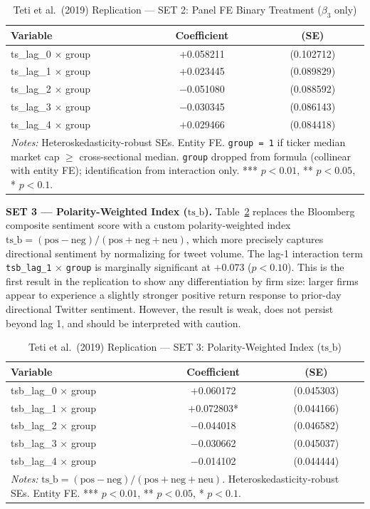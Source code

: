 \documentclass[12pt]{article}
\begin{document}
\begin{table}[htbp]
\centering
\caption{Teti et al.\ (2019) Replication --- SET 2: Panel FE Binary Treatment ($\beta_3$ only)}
\label{tab:teti_set2}
\begin{tabular}{lcc}
\hline\hline
Variable & Coefficient & (SE) \\
\hline
ts\_lag\_0 $\times$ group & $+$0.058211 & (0.102712) \\
ts\_lag\_1 $\times$ group & $+$0.023445 & (0.089829) \\
ts\_lag\_2 $\times$ group & $-$0.051080 & (0.088592) \\
ts\_lag\_3 $\times$ group & $-$0.030345 & (0.086143) \\
ts\_lag\_4 $\times$ group & $+$0.029466 & (0.084418) \\
\hline\hline
\multicolumn{3}{p{0.9\linewidth}}{\footnotesize \textit{Notes:} Heteroskedasticity-robust SEs. Entity FE. \texttt{group = 1} if ticker median market cap $\geq$ cross-sectional median. \texttt{group} dropped from formula (collinear with entity FE); identification from interaction only. *** $p<0.01$, ** $p<0.05$, * $p<0.1$.}
\end{tabular}
\end{table}

\textbf{SET 3 --- Polarity-Weighted Index ($\text{ts\_b}$).} Table~\ref{tab:teti_set3} replaces the Bloomberg composite sentiment score with a custom polarity-weighted index $\text{ts\_b} = (\text{pos} - \text{neg}) / (\text{pos} + \text{neg} + \text{neu})$, which more precisely captures directional sentiment by normalizing for tweet volume. The lag-1 interaction term \texttt{tsb\_lag\_1} $\times$ \texttt{group} is marginally significant at $+$0.073 ($p < 0.10$). This is the first result in the replication to show any differentiation by firm size: larger firms appear to experience a slightly stronger positive return response to prior-day directional Twitter sentiment. However, the result is weak, does not persist beyond lag 1, and should be interpreted with caution.

\begin{table}[htbp]
\centering
\caption{Teti et al.\ (2019) Replication --- SET 3: Polarity-Weighted Index ($\text{ts\_b}$)}
\label{tab:teti_set3}
\begin{tabular}{lcc}
\hline\hline
Variable & Coefficient & (SE) \\
\hline
tsb\_lag\_0 $\times$ group & $+$0.060172 & (0.045303) \\
tsb\_lag\_1 $\times$ group & $+$0.072803* & (0.044166) \\
tsb\_lag\_2 $\times$ group & $-$0.044018 & (0.046582) \\
tsb\_lag\_3 $\times$ group & $-$0.030662 & (0.045037) \\
tsb\_lag\_4 $\times$ group & $-$0.014102 & (0.044444) \\
\hline\hline
\multicolumn{3}{p{0.9\linewidth}}{\footnotesize \textit{Notes:} $\text{ts\_b} = (\text{pos} - \text{neg}) / (\text{pos} + \text{neg} + \text{neu})$. Heteroskedasticity-robust SEs. Entity FE. *** $p<0.01$, ** $p<0.05$, * $p<0.1$.}
\end{tabular}
\end{table}
\end{document}
